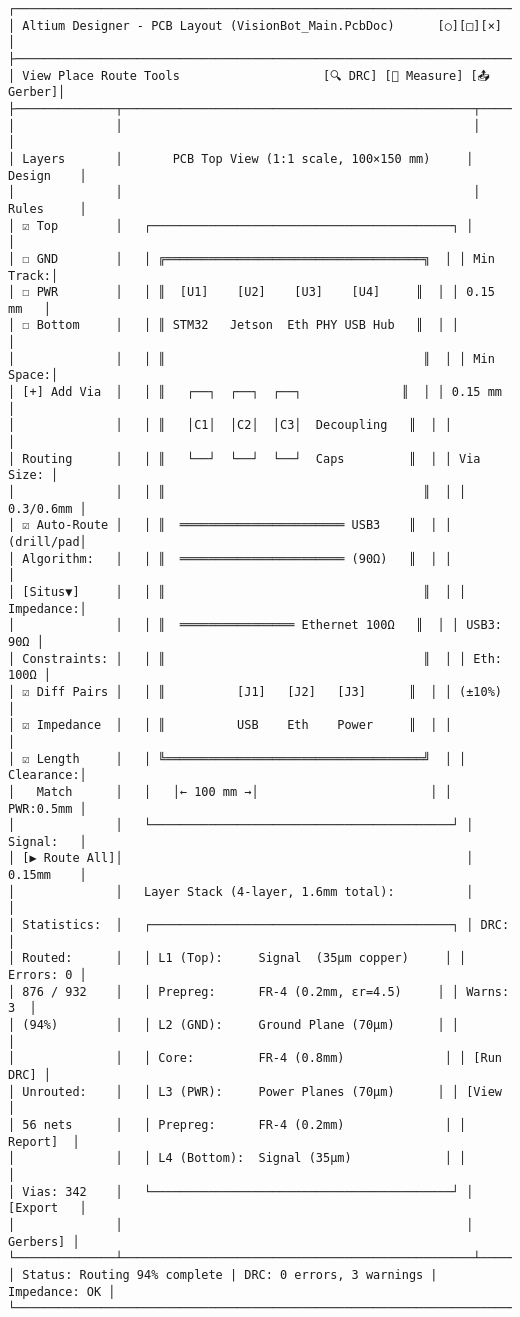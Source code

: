 \documentclass[
]{article}
\begin{document}
\begin{verbatim}
┌────────────────────────────────────────────────────────────────────────────┐
│ Altium Designer - PCB Layout (VisionBot_Main.PcbDoc)      [○][□][×]        │
├────────────────────────────────────────────────────────────────────────────┤
│ View Place Route Tools                    [🔍 DRC] [📐 Measure] [📤 Gerber]│
├──────────────┬─────────────────────────────────────────────────┬───────────┤
│              │                                                 │           │
│ Layers       │       PCB Top View (1:1 scale, 100×150 mm)     │ Design    │
│              │                                                 │ Rules     │
│ ☑ Top        │   ┌──────────────────────────────────────────┐ │           │
│ ☐ GND        │   │ ╔════════════════════════════════════╗  │ │ Min Track:│
│ ☐ PWR        │   │ ║  [U1]    [U2]    [U3]    [U4]     ║  │ │ 0.15 mm   │
│ ☐ Bottom     │   │ ║ STM32   Jetson  Eth PHY USB Hub   ║  │ │           │
│              │   │ ║                                    ║  │ │ Min Space:│
│ [+] Add Via  │   │ ║   ┌──┐  ┌──┐  ┌──┐              ║  │ │ 0.15 mm   │
│              │   │ ║   │C1│  │C2│  │C3│  Decoupling   ║  │ │           │
│ Routing      │   │ ║   └──┘  └──┘  └──┘  Caps         ║  │ │ Via Size: │
│              │   │ ║                                    ║  │ │ 0.3/0.6mm │
│ ☑ Auto-Route │   │ ║  ═══════════════════════ USB3    ║  │ │ (drill/pad│
│ Algorithm:   │   │ ║  ═══════════════════════ (90Ω)   ║  │ │           │
│ [Situs▼]     │   │ ║                                    ║  │ │ Impedance:│
│              │   │ ║  ════════════════ Ethernet 100Ω   ║  │ │ USB3: 90Ω │
│ Constraints: │   │ ║                                    ║  │ │ Eth: 100Ω │
│ ☑ Diff Pairs │   │ ║          [J1]   [J2]   [J3]      ║  │ │ (±10%)    │
│ ☑ Impedance  │   │ ║          USB    Eth    Power     ║  │ │           │
│ ☑ Length     │   │ ╚════════════════════════════════════╝  │ │ Clearance:│
│   Match      │   │   │← 100 mm →│                        │ │ PWR:0.5mm │
│              │   └──────────────────────────────────────────┘ │ Signal:   │
│ [▶ Route All]│                                                │ 0.15mm    │
│              │   Layer Stack (4-layer, 1.6mm total):          │           │
│ Statistics:  │   ┌──────────────────────────────────────────┐ │ DRC:      │
│ Routed:      │   │ L1 (Top):     Signal  (35µm copper)     │ │ Errors: 0 │
│ 876 / 932    │   │ Prepreg:      FR-4 (0.2mm, εr=4.5)     │ │ Warns: 3  │
│ (94%)        │   │ L2 (GND):     Ground Plane (70µm)      │ │           │
│              │   │ Core:         FR-4 (0.8mm)              │ │ [Run DRC] │
│ Unrouted:    │   │ L3 (PWR):     Power Planes (70µm)      │ │ [View     │
│ 56 nets      │   │ Prepreg:      FR-4 (0.2mm)              │ │  Report]  │
│              │   │ L4 (Bottom):  Signal (35µm)             │ │           │
│ Vias: 342    │   └──────────────────────────────────────────┘ │ [Export   │
│              │                                                │  Gerbers] │
└──────────────┴─────────────────────────────────────────────────┴───────────┘
│ Status: Routing 94% complete | DRC: 0 errors, 3 warnings | Impedance: OK │
└────────────────────────────────────────────────────────────────────────────┘
\end{verbatim}
\end{document}
